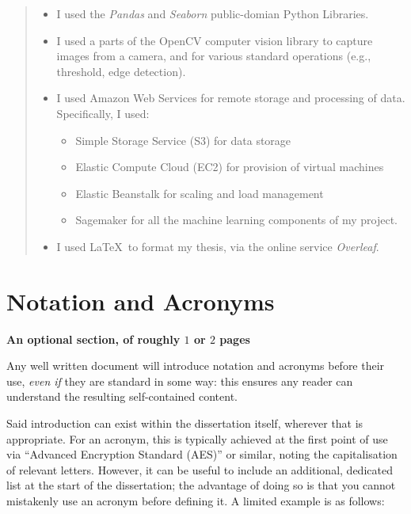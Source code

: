 \documentclass{dissertation}
\begin{document}
\begin{quote}
\noindent
\begin{itemize}

\item I used the {\em Pandas} and {\em Seaborn} public-domian Python Libraries. 

\item I used a parts of the OpenCV computer vision library to capture 
      images from a camera, and for various standard operations (e.g., 
      threshold, edge detection).

\item I used Amazon Web Services for remote storage and processing of data. Specifically, I used:
 \begin{itemize}
 \item Simple Storage Service (S3) for data storage
 \item Elastic Compute Cloud (EC2) for provision of virtual machines
 \item Elastic Beanstalk for scaling and load management
 \item Sagemaker for all the machine learning components of my project. 
 \end{itemize}
 
\item I used \LaTeX\ to format my thesis, via the online service {\em Overleaf}. 
\end{itemize}
\end{quote}


\chapter*{Notation and Acronyms}

{\bf An optional section, of roughly $1$ or $2$ pages}
\vspace{1cm} 

\noindent
Any well written document will introduce notation and acronyms before
their use, {\em even if} they are standard in some way: this ensures 
any reader can understand the resulting self-contained content.  

Said introduction can exist within the dissertation itself, wherever 
that is appropriate.  For an acronym, this is typically achieved at 
the first point of use via ``Advanced Encryption Standard (AES)'' or 
similar, noting the capitalisation of relevant letters.  However, it 
can be useful to include an additional, dedicated list at the start 
of the dissertation; the advantage of doing so is that you cannot 
mistakenly use an acronym before defining it.  A limited example is 
as follows:
\end{document}
